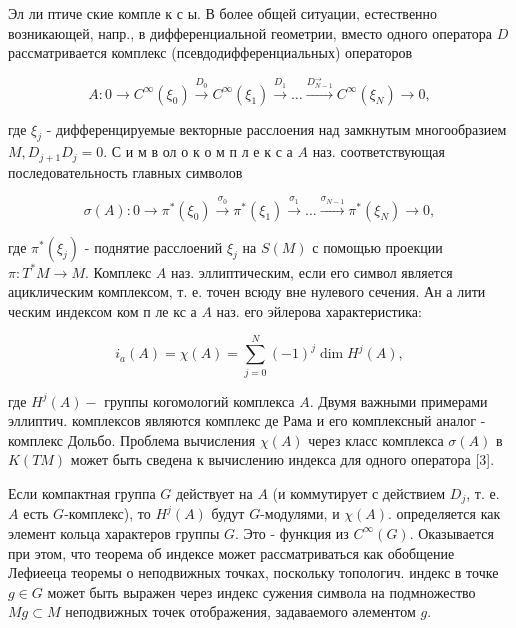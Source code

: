 \documentclass[10pt]{article}
\begin{document}
Эл ли птиче ские компле к с ы. В более общей ситуации, естественно возникающей, напр., в дифференциальной геометрии, вместо одного оператора $D$ рассматривается комплекс (псевдодифференциальных) операторов



\[

A: 0 \rightarrow C^{\infty}\left(\xi_{0}\right) \stackrel{D_{0}}{\longrightarrow} C^{\infty}\left(\xi_{1}\right) \stackrel{D_{1}}{\longrightarrow} \ldots \stackrel{D_{N-1}^{\longrightarrow}}{\longrightarrow} C^{\infty}\left(\xi_{N}\right) \rightarrow 0,

\]



где $\xi_{j}$ - дифференцируемые векторные расслоения над замкнутым многообразием $M, D_{j+1} D_{j}=0$. С и м в ол о к о м п л е к с а $A$ наз. соответствующая последовательность главных символов



\[

\sigma(A): 0 \rightarrow \pi^{*}\left(\xi_{0}\right) \stackrel{\sigma_{0}}{\longrightarrow} \pi^{*}\left(\xi_{1}\right) \stackrel{\sigma_{1}}{\longrightarrow} \ldots \stackrel{\sigma_{N-1}}{\longrightarrow} \pi^{*}\left(\xi_{N}\right) \rightarrow 0,

\]



где $\pi^{*}\left(\xi_{j}\right)$ - поднятие расслоений $\xi_{j}$ на $S(M)$ с помощью проекции $\pi: T^{*} M \rightarrow M$. Комплекс $A$ наз. эллиптическим, если его символ является ациклическим комплексом, т. е. точен всюду вне нулевого сечения. Ан а лити ческим индексом ком п ле кс а $A$ наз. его эйлерова характеристика:



\[

i_{a}(A)=\chi(A)=\sum_{j=0}^{N}(-1)^{j} \operatorname{dim} H^{j}(A),

\]



где $H^{j}(A)-$ группы когомологий комплекса $A$. Двумя важными примерами эллиптич. комплексов являются комплекс де Рама и его комплексный аналог - комплекс Дольбо. Проблема вычисления $\chi(A)$ через класс комплекса $\sigma(A)$ в $K(T M)$ может быть сведена к вычислению индекса для одного оператора [3].



Если компактная группа $G$ действует на $A$ (и коммутирует с действием $D_{j}$, т. е. $A$ есть $G$-комплекс), то $H^{j}(A)$ будут $G$-модулями, и $\chi(A)$. определяется как элемент кольца характеров группы $G$. Это - функция из $C^{\infty}(G)$. Оказывается при этом, что теорема об индексе может рассматриваться как обобщение Лефиееца теоремы о неподвижных точках, поскольку топологич. индекс в точке $g \in G$ может быть выражен через индекс сужения символа на подмножество $M g \subset M$ неподвижных точек отображения, задаваемого әлементом $g$.
\end{document}
